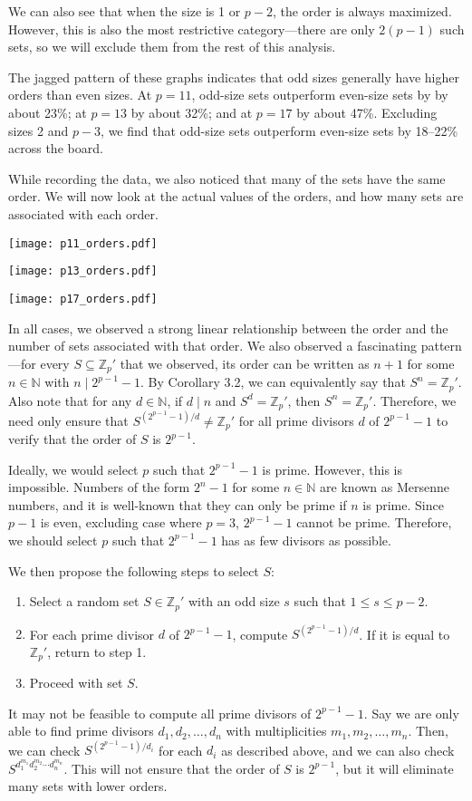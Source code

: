 \documentclass{article}
\newcommand{\zee}{\mathbb{Z}}
\newcommand{\N}{\mathbb{N}}
\begin{document}
We can also see that when the size is 1 or $p - 2$,
the order is always maximized. However, this is also the most
restrictive category---there are only $2(p-1)$ such sets,
so we will exclude them from the rest of this analysis.

The jagged pattern of these graphs indicates that odd sizes
generally have higher orders than even sizes. At $p = 11$,
odd-size sets outperform even-size sets by by about 23\%;
at $p = 13$ by about 32\%; and at $p = 17$ by about 47\%.
Excluding sizes 2 and $p - 3$, we find that odd-size
sets outperform even-size sets by 18--22\% across the board.

While recording the data, we also noticed that many of the
sets have the same order. We will now look at the actual values
of the orders, and how many sets are associated with each order.

\texttt{[image: p11\_orders.pdf]}

\texttt{[image: p13\_orders.pdf]}

\texttt{[image: p17\_orders.pdf]}

In all cases, we observed a strong linear relationship between
the order and the number of sets associated with that order.
We also observed a fascinating pattern---for every
$S \subseteq \zee_p'$ that we observed, its order
can be written as $n + 1$
for some $n \in \N$ with $n \mid 2^{p-1}-1$.
By Corollary 3.2, we can equivalently say that
$S^n = \zee_p'$.
Also note that for any $d \in \N$,
if $d \mid n$ and $S^d = \zee_p'$,
then $S^n = \zee_p'$.
Therefore, we need only ensure that
$S^{(2^{p-1}-1)/d} \neq \zee_p'$
for all prime divisors $d$ of $2^{p-1}-1$
to verify that the order of $S$ is $2^{p-1}$.

Ideally, we would select $p$ such that $2^{p-1}-1$ is prime.
However, this is impossible. Numbers of the form $2^n-1$
for some $n \in \N$ are known as Mersenne numbers,
and it is well-known that they can only be prime if $n$ is prime.
Since $p-1$ is even, excluding case where $p = 3$,
$2^{p-1}-1$ cannot be prime.
Therefore, we should select $p$
such that $2^{p-1}-1$ has as few divisors as possible.

We then propose the following steps to select $S$:
\begin{enumerate}
    \item Select a random set $S \in \zee_p'$ with an odd size
    $s$ such that $1 \leq s \leq p - 2$.
    \item For each prime divisor $d$ of $2^{p-1}-1$, compute
    $S^{(2^{p-1}-1)/d}$. If it is equal to $\zee_p'$, return to step 1.
    \item Proceed with set $S$.
\end{enumerate}
It may not be feasible to compute all prime divisors of
$2^{p-1}-1$. Say we are only able to find prime divisors
$d_1, d_2, \ldots, d_n$ with multiplicities $m_1, m_2, \ldots, m_n$.
Then, we can check $S^{(2^{p-1}-1) / d_i}$ for each $d_i$ as described
above, and we can also check $S^{d_1^{m_1}d_2^{m_2}\cdots d_n^{m_n}}$.
This will not ensure that the order of $S$ is $2^{p-1}$, but it will
eliminate many sets with lower orders.
\end{document}
